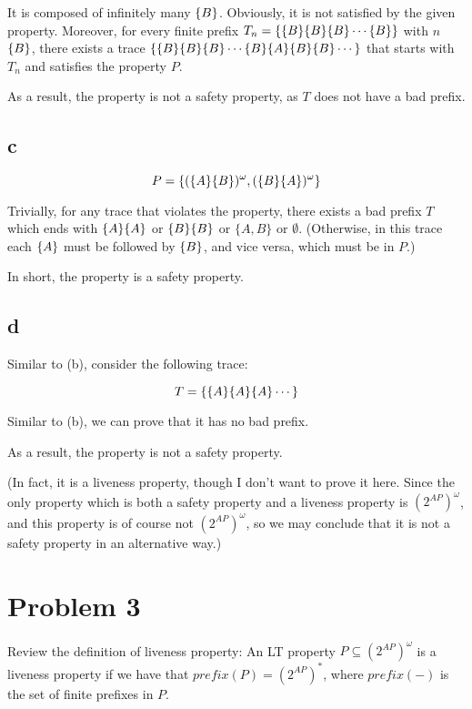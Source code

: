 It is composed of infinitely many $\{B\}$. Obviously, it is not satisfied by the given property.
Moreover, for every finite prefix $T_n = \{\{B\} \{B\} \{B\} \cdots \{B\}\}$ with $n$ $\{B\}$,
there exists a trace $\{\{B\} \{B\} \{B\} \cdots \{B\} \{A\} \{B\} \{B\} \cdots\}$
that starts with $T_n$ and satisfies the property $P$.

As a result, the property is not a safety property, as $T$ does not have a bad prefix.

\subsection{c}

$$
P = \{ (\{A\} \{B\})^\omega, (\{B\} \{A\})^\omega \}
$$

Trivially, for any trace that violates the property, there exists a bad prefix $T$
which ends with $\{A\} \{A\}$ or $\{B\} \{B\}$ or $\{A, B\}$ or $\emptyset$.
(Otherwise, in this trace each $\{A\}$ must be followed by $\{B\}$, and vice versa, which must be in $P$.)

In short, the property is a safety property.

\subsection{d}

Similar to (b), consider the following trace:

$$
T = \{\{A\} \{A\} \{A\} \cdots \}
$$

Similar to (b), we can prove that it has no bad prefix.

As a result, the property is not a safety property.

(In fact, it is a liveness property, though I don't want to prove it here.
Since the only property which is both a safety property and a liveness property is $(2^{AP})^\omega$,
and this property is of course not $(2^{AP})^\omega$, so we may conclude that it is not a safety property
in an alternative way.)

\section{Problem 3}

\newcommand{\pref}{\textit{prefix}}

Review the definition of liveness property:
An LT property $P \subseteq (2^{AP})^\omega$ is a liveness property if we have that
$\pref(P) = (2^{AP})^*$, where $\pref(-)$ is the set of finite prefixes in $P$.


